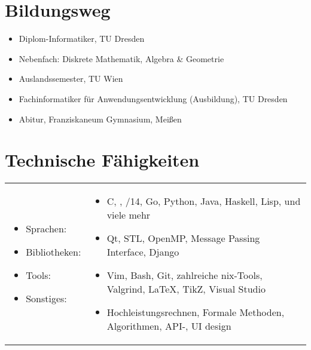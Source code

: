 \customhrule
\section*{Bildungsweg}
\begin{itemize}
	\item {}
		Diplom-Informatiker, TU Dresden
	\item \hspace{1em} Nebenfach: Diskrete Mathematik, Algebra \& Geometrie
	\item {}
		Auslandssemester, TU Wien
	\item {}
		Fachinformatiker f\"ur Anwendungsentwicklung (Ausbildung), TU Dresden
	\item {}
		Abitur, Franziskaneum Gymnasium, Mei\ss en
\end{itemize}

\pagebreak
\section*{Technische F\"ahigkeiten}
\vspace{0.1cm} %
\begin{tabular}{l l}
	\begin{minipage}{0.18\textwidth}
		\begin{itemize}
			\item Sprachen:
			\item Bibliotheken:
			\item Tools:
			\item Sonstiges:
		\end{itemize}
	\end{minipage}
	&
	\begin{minipage}{0.80\textwidth}
		\begin{itemize}
			\item C, \cpp, \cpp11/14, Go, Python, Java, Haskell, Lisp, und viele mehr
			\item Qt, STL, OpenMP, Message Passing Interface, Django
			\item Vim, Bash, Git, zahlreiche \textasteriskcentered{}nix-Tools, Valgrind, \LaTeX, TikZ, Visual Studio
			\item Hochleistungsrechnen, Formale Methoden, Algorithmen, API-, UI design
		\end{itemize}
	\end{minipage}
\end{tabular}

